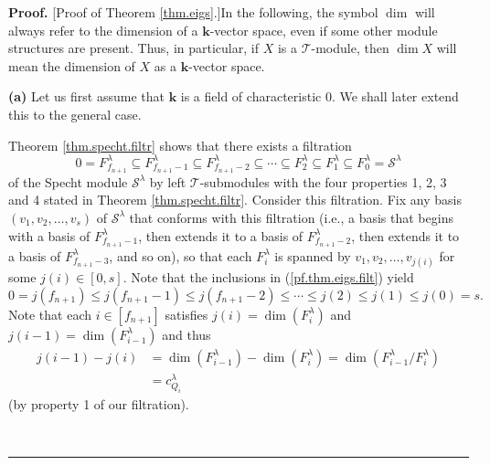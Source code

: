 \documentclass[numbers=enddot,12pt,final,onecolumn,notitlepage]{scrartcl}%
\theoremstyle{definition}
\newenvironment{proof}[1][Proof]{\noindent\textbf{#1.} }{\ \rule{0.5em}{0.5em}}
\begin{document}
\begin{proof}
[Proof of Theorem \ref{thm.eigs}.]In the following, the symbol $\dim$ will
always refer to the dimension of a $\mathbf{k}$-vector space, even if some
other module structures are present. Thus, in particular, if $X$ is a
$\mathcal{T}$-module, then $\dim X$ will mean the dimension of $X$ as a
$\mathbf{k}$-vector space. \medskip

\textbf{(a)} Let us first assume that $\mathbf{k}$ is a field of
characteristic $0$. We shall later extend this to the general case.

Theorem \ref{thm.specht.filtr} shows that there exists a filtration
\begin{equation}
0=F_{f_{n+1}}^{\lambda}\subseteq F_{f_{n+1}-1}^{\lambda}\subseteq
F_{f_{n+1}-2}^{\lambda}\subseteq\cdots\subseteq F_{2}^{\lambda}\subseteq
F_{1}^{\lambda}\subseteq F_{0}^{\lambda}=\mathcal{S}^{\lambda}
\label{pf.thm.eigs.filt}%
\end{equation}
of the Specht module $\mathcal{S}^{\lambda}$ by left $\mathcal{T}$-submodules
with the four properties 1, 2, 3 and 4 stated in Theorem
\ref{thm.specht.filtr}. Consider this filtration. Fix any basis $\left(
v_{1},v_{2},\ldots,v_{s}\right)  $ of $\mathcal{S}^{\lambda}$ that conforms
with this filtration (i.e., a basis that begins with a basis of $F_{f_{n+1}%
-1}^{\lambda}$, then extends it to a basis of $F_{f_{n+1}-2}^{\lambda}$, then
extends it to a basis of $F_{f_{n+1}-3}^{\lambda}$, and so on), so that each
$F_{i}^{\lambda}$ is spanned by $v_{1},v_{2},\ldots,v_{j\left(  i\right)  }$
for some $j\left(  i\right)  \in\left[  0,s\right]  $. Note that the
inclusions in (\ref{pf.thm.eigs.filt}) yield%
\[
0=j\left(  f_{n+1}\right)  \leq j\left(  f_{n+1}-1\right)  \leq j\left(
f_{n+1}-2\right)  \leq\cdots\leq j\left(  2\right)  \leq j\left(  1\right)
\leq j\left(  0\right)  =s.
\]
Note that each $i\in\left[  f_{n+1}\right]  $ satisfies $j\left(  i\right)
=\dim\left(  F_{i}^{\lambda}\right)  $ and $j\left(  i-1\right)  =\dim\left(
F_{i-1}^{\lambda}\right)  $ and thus
\begin{align}
j\left(  i-1\right)  -j\left(  i\right)   &  =\dim\left(  F_{i-1}^{\lambda
}\right)  -\dim\left(  F_{i}^{\lambda}\right)  =\dim\left(  F_{i-1}^{\lambda
}/F_{i}^{\lambda}\right) \nonumber\\
&  =c_{Q_{i}}^{\lambda} \label{pf.thm.eigs.j-j}%
\end{align}
(by property 1 of our filtration).


\end{proof}
\end{document}
